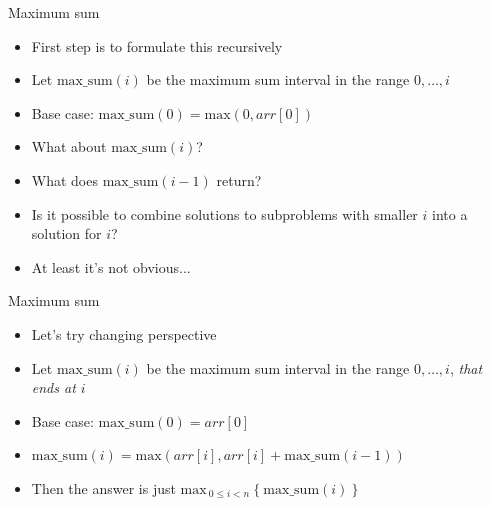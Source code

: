 \documentclass{beamer}
\begin{document}
\begin{frame}[plain]{Maximum sum}

    \vspace{20pt}

    \begin{itemize}
        \item First step is to formulate this recursively
        \vspace{5pt}
        \item Let $\mathrm{max\_{}sum}(i)$ be the maximum sum interval in the range $0,\ldots,i$
        \vspace{5pt}
        \item Base case: $\mathrm{max\_{}sum}(0) = \mathrm{max}(0, arr[0])$
        \vspace{5pt}
        \item What about $\mathrm{max\_{}sum}(i)$?
        \item What does $\mathrm{max\_{}sum}(i-1)$ return?
        \item Is it possible to combine solutions to subproblems with smaller $i$ into a solution for $i$?
        \vspace{5pt}
        \item At least it's not obvious...
    \end{itemize}

\end{frame}

\begin{frame}[plain]{Maximum sum}

    \vspace{20pt}

    \begin{itemize}
        \item Let's try changing perspective
        \vspace{5pt}
    \item Let $\mathrm{max\_{}sum}(i)$ be the maximum sum interval in the range $0,\ldots,i$, \textit{that ends at $i$}
        \vspace{5pt}
        \item Base case: $\mathrm{max\_{}sum}(0) = arr[0]$
        \vspace{5pt}
    \item $\mathrm{max\_{}sum}(i) = \mathrm{max}(arr[i], arr[i] + \mathrm{max\_{}sum}(i - 1))$
        \vspace{15pt}
        \item Then the answer is just $\mathrm{max}_{\ 0 \leq i < n}\ \{\ \mathrm{max\_{}sum}(i)\ \}$
    \end{itemize}

\end{frame}
\end{document}
